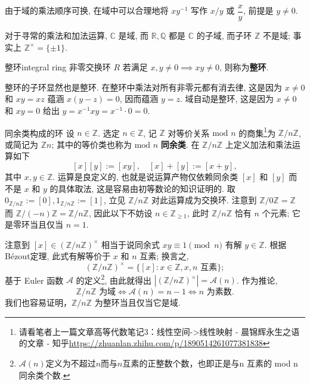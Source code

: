 \documentclass[12pt, a4paper]{ctexart}
\begin{document}
由于域的乘法顺序可换, 在域中可以合理地将 $xy^{-1}$ 写作 $x/y$ 或 $\dfrac{x}{y}$, 前提是 $y \neq 0$.
\begin{example}{}{}
	对于寻常的乘法和加法运算, $\mathbb{C}$ 是域, 而 $\mathbb{R}, \mathbb{Q}$ 都是 $\mathbb{C}$ 的子域, 而子环 $\mathbb{Z}$ 不是域; 事实上 $\mathbb{Z}^\times = \{\pm 1\}$.
\end{example}
\begin{definition}{整环}{integral ring}
	非零交换环 $R$ 若满足 $x, y \neq 0 \implies xy \neq 0$, 则称为\textbf{整环}.
\end{definition}
整环的子环显然也是整环. 在整环中乘法对所有非零元都有消去律, 这是因为 $x \neq 0$ 和 $xy = xz$ 蕴涵 $x(y-z) = 0$, 因而蕴涵 $y = z$. 域自动是整环, 这是因为 $x \neq 0$ 和 $xy = 0$ 给出 $y = x^{-1}xy = x^{-1} \cdot 0 = 0$.
\begin{example}{同余类构成的环}{}
	设 $n \in \mathbb{Z}$. 选定 $n \in \mathbb{Z}$, 记 $\mathbb{Z}$ 对等价关系 $\text{mod } n$ 的商集\footnote{请看笔者上一篇文章高等代数笔记3：线性空间->线性映射 - 晨锦辉永生之语的文章 - 知乎\url{https://zhuanlan.zhihu.com/p/1890514261077381838}}为 $\mathbb{Z}/n\mathbb{Z}$, 或简记为 $\mathbb{Z}n$; 其中的等价类也称为 $\text{mod } n$ \textbf{同余类}. 在 $\mathbb{Z}/n\mathbb{Z}$ 上定义加法和乘法运算如下
	\[
	[x][y] := [xy], \quad [x] + [y] := [x + y],
	\]其中 $x, y \in \mathbb{Z}$. 运算是良定义的, 也就是说运算产物仅依赖同余类 $[x]$ 和 $[y]$ 而不是 $x$ 和 $y$ 的具体取法, 这是容易由初等数论的知识证明的. 取 $0_{\mathbb{Z}/n\mathbb{Z}} := [0], 1_{\mathbb{Z}/n\mathbb{Z}} := [1]$, 立见 $\mathbb{Z}/n\mathbb{Z}$ 对此运算成为交换环. 注意到 $\mathbb{Z}/0\mathbb{Z} = \mathbb{Z}$ 而 $\mathbb{Z}/(-n)\mathbb{Z} = \mathbb{Z}/n\mathbb{Z}$, 因此以下不妨设 $n \in \mathbb{Z}_{\geqslant 1}$, 此时 $\mathbb{Z}/n\mathbb{Z}$ 恰有 $n$ 个元素; 它是零环当且仅当 $n = 1$.
\end{example}
注意到 $[x] \in (\mathbb{Z}/n\mathbb{Z})^\times$ 相当于说同余式 $xy \equiv 1 \pmod{n}$ 有解 $y \in \mathbb{Z}$. 根据Bézout定理, 此式有解等价于 $x$ 和 $n$ 互素; 换言之,
\[
(\mathbb{Z}/n\mathbb{Z})^\times = \{[x] : x \in \mathbb{Z}, x, n \text{ 互素}\};
\]
基于 Euler 函数 $\mathcal A$ 的定义\footnote{$\mathcal A(n)$定义为不超过$n$而与$n$互素的正整数个数，也即正是与n 互素的 mod n 同余类个数.}, 由此就得出 $|(\mathbb{Z}/n\mathbb{Z})^\times| = \mathcal A(n)$. 作为推论,
\[
\mathbb{Z}/n\mathbb{Z} \text{ 为域} \iff \mathcal A(n) = n - 1 \iff n \text{ 为素数}.
\]
我们也容易证明，$\mathbb{Z}/n\mathbb{Z}$ 为整环当且仅当它是域.
\end{document}
